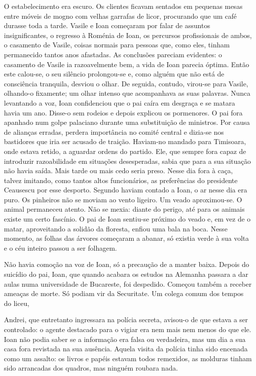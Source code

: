 O estabelecimento era escuro. Os clientes ficavam sentados em pequenas
mesas entre móveis de mogno com velhas garrafas de licor, procurando que
um café durasse toda a tarde. Vasile e Ioan começaram por falar de
assuntos insignificantes, o regresso à Roménia de Ioan, os percursos
profissionais de ambos, o casamento de Vasile, coisas normais para
pessoas que, como eles, tinham permanecido tantos anos afastadas. As
conclusões pareciam evidentes: o casamento de Vasile ia razoavelmente
bem, a vida de Ioan parecia óptima. Então este calou-se, o seu silêncio
prolongou-se e, como alguém que não está de consciência tranquila,
desviou o olhar. De seguida, contudo, virou-se para Vasile, olhando-o fixamente; um olhar intenso que
acompanhava as suas palavras. Nunca levantando a voz, Ioan
confidenciou que o pai caíra em desgraça e se matara havia um ano.
Disse-o sem rodeios e depois explicou os pormenores. O pai fora apanhado
num golpe palaciano durante uma substituição de ministros. Por causa de
alianças erradas, perdera importância no comité central e dizia-se nos
bastidores que iria ser acusado de traição. Haviam-no mandado para
Timisoara, onde estava retido, a aguardar ordens do partido. Ele, que
sempre fora capaz de introduzir razoabilidade em situações desesperadas, sabia que para a sua situação não havia saída. Mais tarde ou mais
cedo seria preso. Nesse dia fora à caça, talvez imitando, como tantos
altos funcionários, as preferências do presidente Ceausescu por esse
desporto. Segundo haviam contado a Ioan, o ar nesse dia era puro. Os
pinheiros não se moviam ao vento ligeiro. Um veado aproximou-se. O animal permaneceu atento. Não se mexia: diante do
perigo, até para os animais existe um certo fascínio. O pai de Ioan
sentiu-se próximo do veado e, em vez de o matar, aproveitando a solidão
da floresta, enfiou uma bala na boca. Nesse momento, as folhas das
árvores começaram a abanar, só existia verde à sua volta e o céu inteiro
passou a ser folhagem.

Não havia comoção na voz de Ioan, só a precaução de a manter baixa.
Depois do suicídio do pai, Ioan, que quando acabara os estudos na
Alemanha passara a dar aulas numa universidade de Bucareste, foi
despedido. Começou também a receber ameaças de morte. Só podiam vir da
Securitate. Um colega comum dos tempos do liceu,

Andrei, que entretanto ingressara na polícia secreta, avisou-o de que
estava a ser controlado: o agente destacado para o vigiar era nem mais
nem menos do que ele. Ioan não podia saber se a informação era falsa ou
verdadeira, mas um dia a sua casa fora revistada na sua ausência. Aquela
visita da polícia tinha sido encenada como um assalto: os livros e
papéis estavam todos remexidos, as molduras tinham sido arrancadas dos
quadros, mas ninguém roubara nada.

